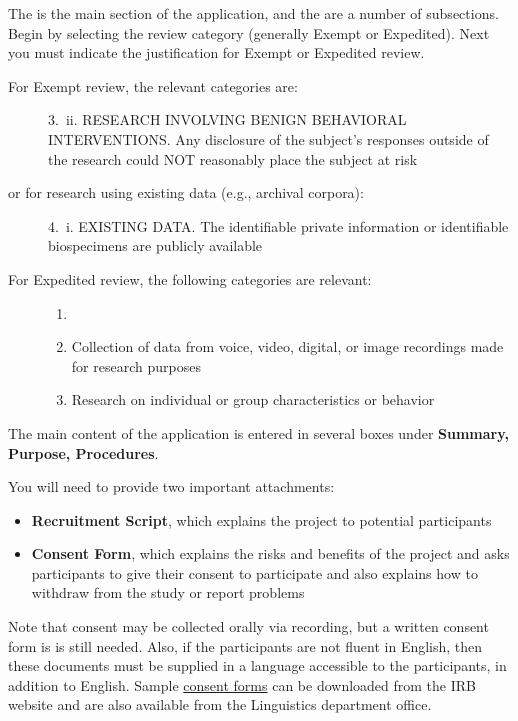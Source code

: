 \documentclass[
]{book}
\providecommand{\tightlist}{%
  \setlength{\itemsep}{0pt}\setlength{\parskip}{0pt}}
\begin{document}
The is the main section of the application, and the are a number of subsections. Begin by selecting the review category (generally Exempt or Expedited). Next you must indicate the justification for Exempt or Expedited review.

\begin{description}
\item[For Exempt review, the relevant categories are:]
3.~ii. RESEARCH INVOLVING BENIGN BEHAVIORAL INTERVENTIONS. Any disclosure of the subject's responses outside of the research could NOT reasonably place the subject at risk
\item[or for research using existing data (e.g., archival corpora):]
4.~i. EXISTING DATA. The identifiable private information or identifiable biospecimens are publicly available
\item[For Expedited review, the following categories are relevant:]
\begin{enumerate}
\def\labelenumi{\arabic{enumi}.}
\setcounter{enumi}{5}
\tightlist
\item[]
\item
  Collection of data from voice, video, digital, or image recordings made for research purposes
\item
  Research on individual or group characteristics or behavior
\end{enumerate}
\end{description}

The main content of the application is entered in several boxes under \textbf{Summary, Purpose, Procedures}.

You will need to provide two important attachments:

\begin{itemize}
\tightlist
\item
  \textbf{Recruitment Script}, which explains the project to potential participants
\item
  \textbf{Consent Form}, which explains the risks and benefits of the project and asks participants to give their consent to participate and also explains how to withdraw from the study or report problems
\end{itemize}

Note that consent may be collected orally via recording, but a written consent form is is still needed. Also, if the participants are not fluent in English, then these documents must be supplied in a language accessible to the participants, in addition to English. Sample \href{https://research.hawaii.edu/orc/human-studies/forms/\#templates}{consent forms} can be downloaded from the IRB website and are also available from the Linguistics department office.
\end{document}
